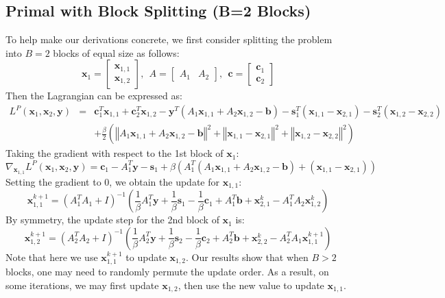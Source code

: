 \documentclass{article}
\begin{document}
\subsection*{Primal with Block Splitting (B=2 Blocks)}

To help make our derivations concrete, we first consider splitting the problem into $B=2$ blocks of equal size as follows:
\[
\mathbf{x}_{1}=\begin{bmatrix}\mathbf{x}_{1,1}\\
\mathbf{x}_{1,2}
\end{bmatrix},
 \ \  
A=\begin{bmatrix}A_{1} & A_{2}\end{bmatrix},
\ \ 
\mathbf{c}=\begin{bmatrix}\mathbf{c}_{1}\\
\mathbf{c}_{2}
\end{bmatrix}
\]
Then the Lagrangian can be expressed as:
\begin{eqnarray*}
L^{P}(\mathbf{x}_{1},\mathbf{x}_{2},\mathbf{y}) & = & \mathbf{c}_{1}^{T}\mathbf{x}_{1,1}+\mathbf{c}_{2}^{T}\mathbf{x}_{1,2}-\mathbf{y}^{T}\left(A_{1}\mathbf{x}_{1,1}+A_{2}\mathbf{x}_{1,2}-\mathbf{b}\right)-\mathbf{s}_{1}^{T}\left(\mathbf{x}_{1,1}-\mathbf{x}_{2,1}\right)-\mathbf{s}_{2}^{T}\left(\mathbf{x}_{1,2}-\mathbf{x}_{2,2}\right)\\
 &  & +\frac{\beta}{2}\left(\left\Vert A_{1}\mathbf{x}_{1,1}+A_{2}\mathbf{x}_{1,2}-\mathbf{b}\right\Vert ^{2}+\left\Vert \mathbf{x}_{1,1}-\mathbf{x}_{2,1}\right\Vert ^{2}+\left\Vert \mathbf{x}_{1,2}-\mathbf{x}_{2,2}\right\Vert ^{2}\right)
\end{eqnarray*}
Taking the gradient with respect to the 1st block of $\mathbf{x}_{1}$:
\[
\nabla_{\mathbf{x}_{1,1}}L^{P}(\mathbf{x}_{1},\mathbf{x}_{2},\mathbf{y})=\mathbf{c}_{1}-A_{1}^{T}\mathbf{y}-\mathbf{s}_{1}+\beta\left(A_{1}^{T}\left(A_{1}\mathbf{x}_{1,1}+A_{2}\mathbf{x}_{1,2}-\mathbf{b}\right)+\left(\mathbf{x}_{1,1}-\mathbf{x}_{2,1}\right)\right)
\]
Setting the gradient to 0, we obtain the update for $\mathbf{x}_{1,1}$:
\[
\mathbf{x}_{1,1}^{k+1}=\left(A_{1}^{T}A_{1}+I\right)^{-1}\left(\frac{1}{\beta}A_{1}^{T}\mathbf{y}+\frac{1}{\beta}\mathbf{s}_{1}-\frac{1}{\beta}\mathbf{c}_{1}+A_{1}^{T}\mathbf{b}+\mathbf{x}_{2,1}^{k}-A_{1}^{T}A_{2}\mathbf{x}_{1,2}^{k}\right)
\]
By symmetry, the update step for the 2nd block of $\mathbf{x}_{1}$
is:
\[
\mathbf{x}_{1,2}^{k+1}=\left(A_{2}^{T}A_{2}+I\right)^{-1}\left(\frac{1}{\beta}A_{2}^{T}\mathbf{y}+\frac{1}{\beta}\mathbf{s}_{2}-\frac{1}{\beta}\mathbf{c}_{2}+A_{2}^{T}\mathbf{b}+\mathbf{x}_{2,2}^{k}-A_{2}^{T}A_{1}\mathbf{x}_{1,1}^{k+1}\right)
\]
Note that here we use $\mathbf{x}_{1,1}^{k+1}$ to update $\mathbf{x}_{1,2}$. Our results show that when $B>2$ blocks, one may need to randomly permute the update order. As a result, on some iterations, we may first update $\mathbf{x}_{1,2}$, then use the new value to update $\mathbf{x}_{1,1}$. 
\end{document}
